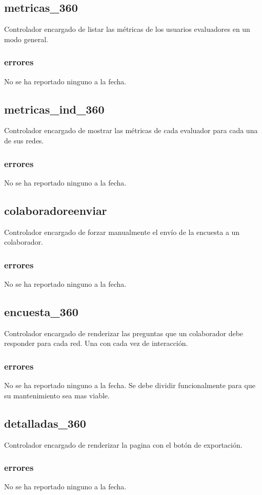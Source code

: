 \documentclass[10pt,a4paper]{book}
\begin{document}
	\subsection{metricas\_360}
	Controlador encargado de listar las métricas de los usuarios evaluadores en un modo general.
	\subsubsection{errores}
	No se ha reportado ninguno a la fecha.
	
	\subsection{metricas\_ind\_360}
	Controlador encargado de mostrar las métricas de cada evaluador para cada una de sus redes.
	\subsubsection{errores}
	No se ha reportado ninguno a la fecha.
	
	\subsection{colaboradoreenviar}
	Controlador encargado de forzar manualmente el envío de la encuesta a un colaborador.
	\subsubsection{errores}
	No se ha reportado ninguno a la fecha.
	
	\subsection{encuesta\_360}
	Controlador encargado de renderizar las preguntas que un colaborador debe responder para cada red. Una con cada vez de interacción.
	\subsubsection{errores}
	No se ha reportado ninguno a la fecha. Se debe dividir funcionalmente para que su mantenimiento sea mas viable.
	
	\subsection{detalladas\_360}
	Controlador encargado de renderizar la pagina con el botón de exportación.
	\subsubsection{errores}
	No se ha reportado ninguno a la fecha.
	
\end{document}
